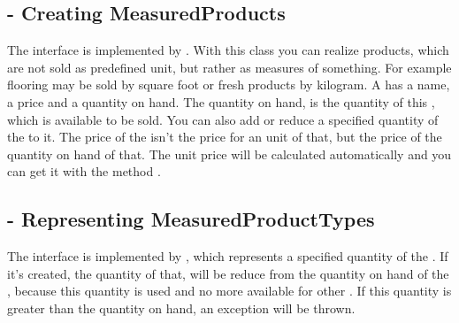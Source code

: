 \subsection{ - Creating MeasuredProducts}
The interface  is implemented by . With this class you can realize products, which are not sold as predefined unit, but rather 
as measures of something. For example flooring may be sold by square foot or fresh products by kilogram.
A  has a name, a price and a quantity on hand. The quantity on hand, is the quantity of this , which is available to 
be sold. You can also add or reduce a specified quantity of the  to it. 
The price of the  isn’t the price for an unit of that, but the price of the quantity on hand of that. The unit price will be calculated automatically 
and you can get it with the method .

\subsection{ - Representing MeasuredProductTypes}
The interface  is implemented by , which represents a specified quantity of the . If it’s 
created, the quantity of that, will be reduce from the quantity on hand of the , because this quantity is used and no more available for other 
. If this quantity is greater than the quantity on hand, an exception will be thrown.